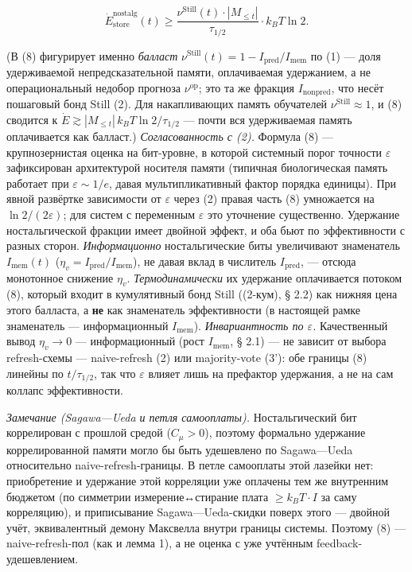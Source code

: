 \documentclass[pdflatex,sn-mathphys-ay]{sn-jnl}
\begin{document}
\begin{equation}\dot{E}_{\text{store}}^{\text{nostalg}}(t) \ge \frac{\nu^{\text{Still}}(t) \cdot |M_{\le t}|}{\tau_{1/2}} \cdot k_B T \ln 2. \tag{8}\end{equation}



(В (8) фигурирует именно \emph{балласт} \(\nu^{\text{Still}}(t) = 1 - I_{\text{pred}}/I_{\text{mem}}\) по (1) --- доля удерживаемой непредсказательной памяти, оплачиваемая удержанием, а не операциональный недобор прогноза \(\nu^{\text{op}}\); это та же фракция \(I_{\text{nonpred}}\), что несёт пошаговый бонд Still (2). Для накапливающих память обучателей \(\nu^{\text{Still}} \approx 1\), и (8) сводится к \(\dot E \gtrsim |M_{\le t}|\,k_B T\ln 2/\tau_{1/2}\) --- почти вся удерживаемая память оплачивается как балласт.) \emph{Согласованность с (2).} Формула (8) --- крупнозернистая оценка на бит-уровне, в которой системный порог точности \(\varepsilon\) зафиксирован архитектурой носителя памяти (типичная биологическая память работает при \(\varepsilon \sim 1/e\), давая мультипликативный фактор порядка единицы). При явной развёртке зависимости от \(\varepsilon\) через (2) правая часть (8) умножается на \(\ln 2/(2\varepsilon)\); для систем с переменным \(\varepsilon\) это уточнение существенно. Удержание ностальгической фракции имеет двойной эффект, и оба бьют по эффективности с разных сторон. \emph{Информационно} ностальгические биты увеличивают знаменатель \(I_{\text{mem}}(t)\) (\(\eta_v = I_{\text{pred}}/I_{\text{mem}}\)), не давая вклад в числитель \(I_{\text{pred}}\), --- отсюда монотонное снижение \(\eta_v\). \emph{Термодинамически} их удержание оплачивается потоком (8), который входит в кумулятивный бонд Still ((2-кум), § 2.2) как нижняя цена этого балласта, а \textbf{не} как знаменатель эффективности (в настоящей рамке знаменатель --- информационный \(I_{\text{mem}}\)). \emph{Инвариантность по \(\varepsilon\).} Качественный вывод \(\eta_v \to 0\) --- информационный (рост \(I_{\text{mem}}\), § 2.1) --- не зависит от выбора refresh-схемы --- naive-refresh (2) или majority-vote (3'): обе границы (8) линейны по \(t/\tau_{1/2}\), так что \(\varepsilon\) влияет лишь на префактор удержания, а не на сам коллапс эффективности.



\emph{Замечание (Sagawa---Ueda и петля самооплаты).} Ностальгический бит коррелирован с прошлой средой (\(C_\mu > 0\)), поэтому формально удержание коррелированной памяти могло бы быть удешевлено по Sagawa---Ueda относительно naive-refresh-границы. В петле самооплаты этой лазейки нет: приобретение и удержание этой корреляции уже оплачены тем же внутренним бюджетом (по симметрии измерение↔стирание плата \(\ge k_B T \cdot I\) за саму корреляцию), и приписывание Sagawa---Ueda-скидки поверх этого --- двойной учёт, эквивалентный демону Максвелла внутри границы системы. Поэтому (8) --- naive-refresh-пол (как и лемма 1), а не оценка с уже учтённым feedback-удешевлением.
\end{document}
